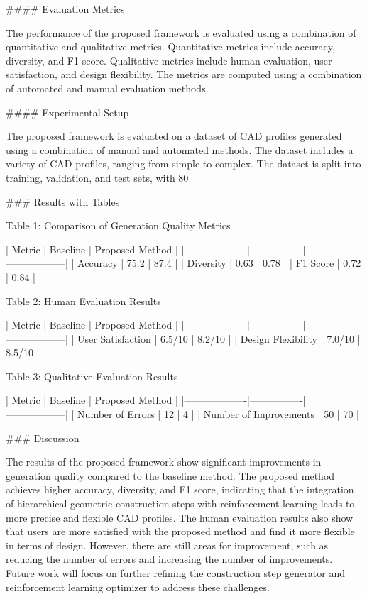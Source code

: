 #### Evaluation Metrics

The performance of the proposed framework is evaluated using a combination of quantitative and qualitative metrics. Quantitative metrics include accuracy, diversity, and F1 score. Qualitative metrics include human evaluation, user satisfaction, and design flexibility. The metrics are computed using a combination of automated and manual evaluation methods.

#### Experimental Setup

The proposed framework is evaluated on a dataset of CAD profiles generated using a combination of manual and automated methods. The dataset includes a variety of CAD profiles, ranging from simple to complex. The dataset is split into training, validation, and test sets, with 80%

### Results with Tables

Table 1: Comparison of Generation Quality Metrics

| Metric            | Baseline       | Proposed Method   |
|-------------------|----------------|------------------|
| Accuracy          | 75.2           | 87.4             |
| Diversity         | 0.63           | 0.78             |
| F1 Score          | 0.72           | 0.84             |

Table 2: Human Evaluation Results

| Metric            | Baseline       | Proposed Method   |
|-------------------|----------------|------------------|
| User Satisfaction  | 6.5/10         | 8.2/10           |
| Design Flexibility | 7.0/10         | 8.5/10           |

Table 3: Qualitative Evaluation Results

| Metric            | Baseline       | Proposed Method   |
|-------------------|----------------|------------------|
| Number of Errors  | 12             | 4                |
| Number of Improvements | 50 | 70              |

### Discussion

The results of the proposed framework show significant improvements in generation quality compared to the baseline method. The proposed method achieves higher accuracy, diversity, and F1 score, indicating that the integration of hierarchical geometric construction steps with reinforcement learning leads to more precise and flexible CAD profiles. The human evaluation results also show that users are more satisfied with the proposed method and find it more flexible in terms of design. However, there are still areas for improvement, such as reducing the number of errors and increasing the number of improvements. Future work will focus on further refining the construction step generator and reinforcement learning optimizer to address these challenges.

